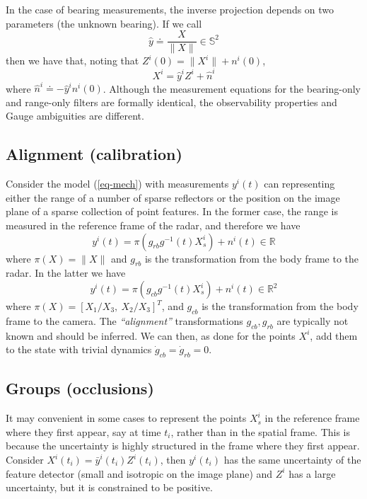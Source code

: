 \documentclass[]{article}
\def\real{\mathbb{R}}
\begin{document}
In the case of bearing measurements, the inverse projection depends on two parameters (the unknown bearing). If we call 
\begin{equation}
\hat y \doteq \frac{X}{\| X \|} \in {\mathbb S}^2
\end{equation}
then we have that, noting that $Z^i(0) = \| X^i \| + n^i(0)$, 
\begin{equation}
X^i = {\hat y}^i Z^i + {\hat n}^i
\label{eq-ran-tri}
\end{equation}
where ${\hat n}^i \doteq - {\hat y}^i n^i(0)$. Although the measurement equations for the bearing-only and range-only filters are formally identical, the observability properties and Gauge ambiguities are different. 

\subsection{Alignment (calibration)} 

Consider the model (\ref{eq-mech}) with measurements $y^i(t)$ can representing either the range of a number of sparse reflectors or the position on the image plane of a sparse collection of point features. In the former case, the range is measured in the reference frame of the radar, and therefore we have 
\begin{equation}
y^i(t) = \pi\left( g_{rb} g^{-1}(t) X_s^i \right) + n^i(t) \in \real
\end{equation}
where $\pi(X) = \| X \|$ and $g_{rb}$ is the transformation from the body frame to the radar. In the latter we have 
\begin{equation}
\boxed{y^i(t) = \pi\left( g_{cb} g^{-1}(t) X_s^i \right) + n^i(t) \in \real^2}
\end{equation}
where $\pi(X) = [X_1/X_3, \ X_2/X_3]^T$, and $g_{cb}$ is the transformation from the body frame to the camera. The {\em ``alignment''} transformations $g_{cb}, g_{rb}$ are typically not known and should be inferred. We can then, as done for the points $X^i$, add them to the state with trivial dynamics $\dot g_{cb} = \dot g_{rb} = 0$.

\subsection{Groups (occlusions)}

It may convenient in some cases to represent the points $X_s^i$ in the reference frame where they first appear, say at time $t_i$, rather than in the spatial frame. This is because the uncertainty is highly structured in the frame where they first appear. 
Consider $X^i(t_i) = \bar y^i(t_i) Z^i(t_i)$, then $y^i(t_i)$ has the same uncertainty of the feature detector (small and isotropic on the image plane) and $Z^i$ has a large uncertainty, but it is constrained to be positive. 
\end{document}
